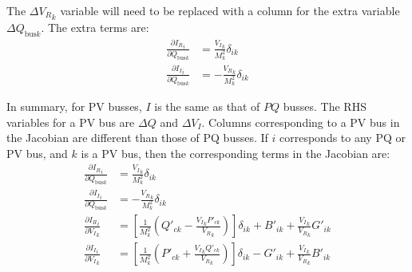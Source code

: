 \documentclass[11pt]{article}
\newcommand{\re}[1]{{{#1}_R}}
\newcommand{\im}[1]{{{#1}_I}}
\begin{document}
The $\re{\Delta V}_k$ variable will need to be replaced with a column for the extra variable $\Delta Q_{\text{bus}k}$.  The extra terms are:
\begin{align}
\frac{\partial \re{I}_i}{\partial Q_{\text{bus}k}} &= \frac{\im{V}_k}{M_k^2}\delta_{ik} \\
\frac{\partial \im{I}_i}{\partial Q_{\text{bus}k}} &= -\frac{\re{V}_k}{M_k^2}\delta_{ik}
\end{align}

In summary, for PV busses, $I$ is the same as that of $PQ$ busses. The RHS variables for a PV bus are $\Delta Q$ and $\im{\Delta V}$. Columns corresponding to a PV bus in the Jacobian are different than those of PQ busses. If $i$ corresponds to any PQ or PV bus, and $k$ is a PV bus, then the corresponding terms in the Jacobian are:
\begin{align}
\frac{\partial \re{I}_i}{\partial Q_{\text{bus}k}} &= \frac{\im{V}_k}{M_k^2}\delta_{ik} \\
\frac{\partial \im{I}_i}{\partial Q_{\text{bus}k}} &= -\frac{\re{V}_k}{M_k^2}\delta_{ik} \\
\frac{\partial \re{I}_i}{\partial \im{V}_{k}} &= \left[\frac{1}{M_k^2}\left(Q'_{ck}  - \frac{\im{V}_kP'_{ck}}{\re{V}_k}\right) \right]\delta_{ik}  + B'_{ik} + \frac{\im{V}_k}{\re{V}_k} G'_{ik} \\
\frac{\partial \im{I}_i}{\partial \im{V}_{k}} &= \left[\frac{1}{M_k^2}\left(P'_{ck}  + \frac{\im{V}_kQ'_{ck}}{\re{V}_k}\right) \right]\delta_{ik}  - G'_{ik} + \frac{\im{V}_k}{\re{V}_k} B'_{ik}
\end{align}
\end{document}
